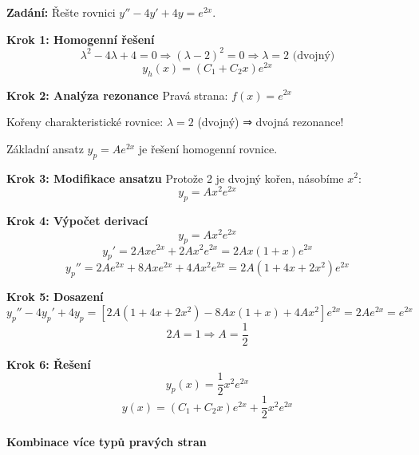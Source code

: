 \begin{example}
\label{ex:dvojna-rezonance-exp}

\noindent\textbf{Zadání:} Řešte rovnici $y'' - 4y' + 4y = e^{2x}$.

\vspace{1.5\baselineskip}

\noindent\textbf{Krok 1: Homogenní řešení}
\[
\lambda^2 - 4\lambda + 4 = 0 \Rightarrow (\lambda - 2)^2 = 0 \Rightarrow \lambda = 2 \text{ (dvojný)}
\]
\[
y_h(x) = (C_1 + C_2 x)e^{2x}
\]

\vspace{1\baselineskip}

\noindent\textbf{Krok 2: Analýza rezonance}
Pravá strana: $f(x) = e^{2x}$

Kořeny charakteristické rovnice: $\lambda = 2$ (dvojný) ⇒ dvojná rezonance!

Základní ansatz $y_p = Ae^{2x}$ je řešení homogenní rovnice.

\vspace{1\baselineskip}

\noindent\textbf{Krok 3: Modifikace ansatzu}
Protože 2 je dvojný kořen, násobíme $x^2$:
\[
y_p = Ax^2e^{2x}
\]

\vspace{1\baselineskip}

\noindent\textbf{Krok 4: Výpočet derivací}
\[
y_p = Ax^2e^{2x}
\]
\[
y_p' = 2Axe^{2x} + 2Ax^2e^{2x} = 2Ax(1 + x)e^{2x}
\]
\[
y_p'' = 2Ae^{2x} + 8Axe^{2x} + 4Ax^2e^{2x} = 2A(1 + 4x + 2x^2)e^{2x}
\]

\vspace{1\baselineskip}

\noindent\textbf{Krok 5: Dosazení}
\[
y_p'' - 4y_p' + 4y_p = [2A(1 + 4x + 2x^2) - 8Ax(1 + x) + 4Ax^2]e^{2x} = 2Ae^{2x} = e^{2x}
\]
\[
2A = 1 \Rightarrow A = \frac{1}{2}
\]

\vspace{1\baselineskip}

\noindent\textbf{Krok 6: Řešení}
\[
y_p(x) = \frac{1}{2}x^2e^{2x}
\]
\[
y(x) = (C_1 + C_2 x)e^{2x} + \frac{1}{2}x^2e^{2x}
\]

\end{example}

\paragraph{Kombinace více typů pravých stran}

